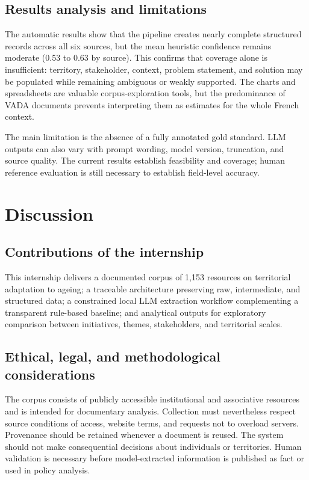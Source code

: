 \section{Results analysis and limitations}

The automatic results show that the pipeline creates nearly complete structured
records across all six sources, but the mean heuristic confidence remains
moderate (0.53 to 0.63 by source). This confirms that coverage alone is
insufficient: territory, stakeholder, context, problem statement, and solution
may be populated while remaining ambiguous or weakly supported. The charts and
spreadsheets are valuable corpus-exploration tools, but the predominance of VADA
documents prevents interpreting them as estimates for the whole French context.

The main limitation is the absence of a fully annotated gold standard. LLM
outputs can also vary with prompt wording, model version, truncation, and source
quality. The current results establish feasibility and coverage; human reference
evaluation is still necessary to establish field-level accuracy.

\chapter{Discussion}

\section{Contributions of the internship}

This internship delivers a documented corpus of 1,153 resources on territorial
adaptation to ageing; a traceable architecture preserving raw, intermediate,
and structured data; a constrained local LLM extraction workflow complementing
a transparent rule-based baseline; and analytical outputs for exploratory
comparison between initiatives, themes, stakeholders, and territorial scales.

\section{Ethical, legal, and methodological considerations}

The corpus consists of publicly accessible institutional and associative
resources and is intended for documentary analysis. Collection must nevertheless
respect source conditions of access, website terms, and requests not to overload
servers. Provenance should be retained whenever a document is reused. The system
should not make consequential decisions about individuals or territories. Human
validation is necessary before model-extracted information is published as fact
or used in policy analysis.

